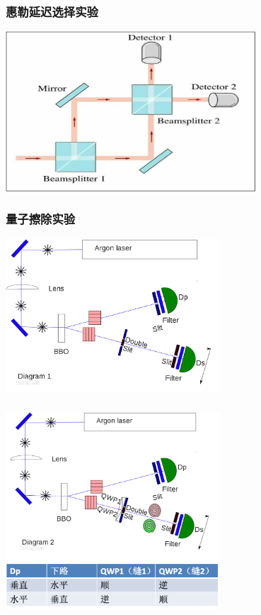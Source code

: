\begin{frame}
    \frametitle{惠勒延迟选择实验}
    \begin{center}
        \includegraphics[width=0.7\textwidth]{figs/choose.png} \\
    \end{center} 
\end{frame}

\begin{frame}
    \frametitle{量子擦除实验}
    \begin{center}
        \includegraphics[width=0.6\textwidth]{figs/c1.png} \\
    \end{center} 
\end{frame}

\begin{frame}
    \frametitle{}
    \begin{center}
        \includegraphics[width=0.6\textwidth]{figs/c2.png} \\
    \end{center} 
\end{frame}

